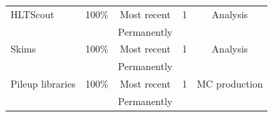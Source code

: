 \begin{table}[tbph]
\begin{tabular}{|l|c|c|c|c|}
    HLTScout               & 100\%       & Most recent        & 1        & Analysis    \\
    \cellcolor{tablerowheader}
                           &             & Permanently        &          &    \\
    \cellcolor{tablerowheader}
     Skims                 &  100\%      & Most recent        & 1        & Analysis    \\
    \cellcolor{tablerowheader}
                           &             & Permanently        &          &   \\
    \cellcolor{tablerowheader}
Pileup libraries           & 100\%       & Most recent        & 1        & MC production   \\
\cellcolor{tablerowheader}
                           &             & Permanently        &          & \\ \hline
\end{tabular}
\label{tab:storagepolicy1}
\end{table}

